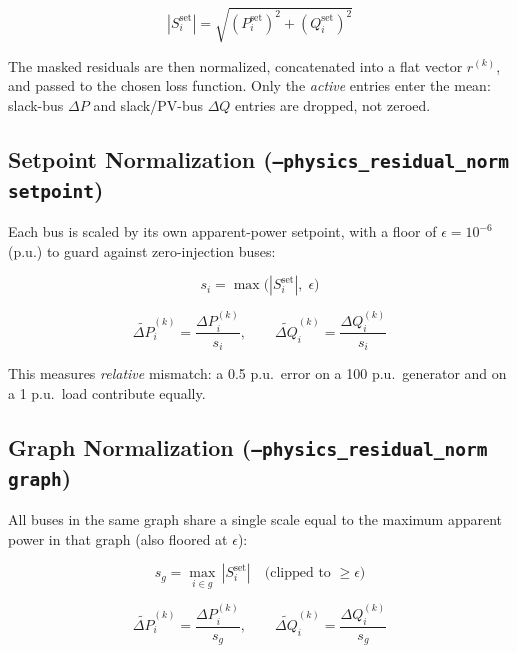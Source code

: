 \documentclass{article}
\begin{document}
\begin{equation}
  |S_i^{\mathrm{set}}| = \sqrt{(P_i^{\mathrm{set}})^2 + (Q_i^{\mathrm{set}})^2}
\end{equation}

The masked residuals are then normalized, concatenated into a flat vector
$r^{(k)}$, and passed to the chosen loss function.  Only the \emph{active}
entries enter the mean: slack-bus $\Delta P$ and slack/PV-bus $\Delta Q$
entries are dropped, not zeroed.

\subsection{Setpoint Normalization (\texttt{--physics\_residual\_norm setpoint})}

Each bus is scaled by its own apparent-power setpoint, with a floor of
$\epsilon = 10^{-6}$ (p.u.) to guard against zero-injection buses:

\begin{equation}
  s_i = \max\!\bigl(|S_i^{\mathrm{set}}|,\;\epsilon\bigr)
\end{equation}

\begin{equation}
  \widetilde{\Delta P}_i^{(k)}
  =
  \frac{\Delta P_i^{(k)}}{s_i},
  \qquad
  \widetilde{\Delta Q}_i^{(k)}
  =
  \frac{\Delta Q_i^{(k)}}{s_i}
\end{equation}

This measures \emph{relative} mismatch: a 0.5 p.u.\ error on a 100 p.u.\
generator and on a 1 p.u.\ load contribute equally.

\subsection{Graph Normalization (\texttt{--physics\_residual\_norm graph})}

All buses in the same graph share a single scale equal to the maximum
apparent power in that graph (also floored at $\epsilon$):

\begin{equation}
  s_g = \max_{i \in g}\,|S_i^{\mathrm{set}}|
  \quad
  \text{(clipped to } \geq \epsilon\text{)}
\end{equation}

\begin{equation}
  \widetilde{\Delta P}_i^{(k)}
  =
  \frac{\Delta P_i^{(k)}}{s_g},
  \qquad
  \widetilde{\Delta Q}_i^{(k)}
  =
  \frac{\Delta Q_i^{(k)}}{s_g}
\end{equation}
\end{document}
